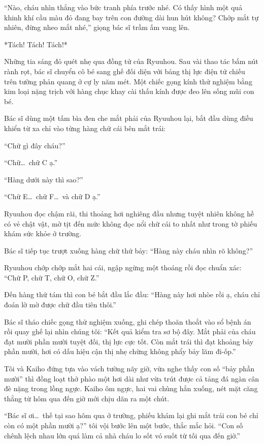 \documentclass[../main.tex]{subfiles}
\begin{document}
``Nào, cháu nhìn thẳng vào bức tranh phía trước nhé. Có thấy hình một quả khinh khí cầu màu đỏ đang bay trên con đường dài hun hút không? Chớp mắt tự nhiên, đừng nheo mắt nhé,'' giọng bác sĩ trầm ấm vang lên.

*Tách! Tách! Tách!*

Những tia sáng đỏ quét nhẹ qua đồng tử của Ryuuhou. Sau vài thao tác bấm nút rành rọt, bác sĩ chuyển cô bé sang ghế đối diện với bảng thị lực điện tử chiếu trên tường phản quang ở cự ly năm mét. Một chiếc gọng kính thử nghiệm bằng kim loại nặng trịch với hàng chục khay cài thấu kính được đeo lên sống mũi con bé.

Bác sĩ dùng một tấm bìa đen che mắt phải của Ryuuhou lại, bắt đầu dùng điều khiển từ xa chỉ vào từng hàng chữ cái bên mắt trái:

``Chữ gì đây cháu?''

``Chữ\dots\ chữ C ạ.''

``Hàng dưới này thì sao?''

``Chữ E\dots\ chữ F\dots\ và chữ D ạ.''

Ryuuhou đọc chậm rãi, thi thoảng hơi nghiêng đầu nhưng tuyệt nhiên không hề có vẻ chật vật, mờ tịt đến mức không đọc nổi chữ cái to nhất như trong tờ phiếu khám sức khỏe ở trường.

Bác sĩ tiếp tục trượt xuống hàng chữ thứ bảy: ``Hàng này cháu nhìn rõ không?''

Ryuuhou chớp chớp mắt hai cái, ngập ngừng một thoáng rồi đọc chuẩn xác: ``Chữ P, chữ T, chữ O, chữ Z.''

Đến hàng thứ tám thì con bé bắt đầu lắc đầu: ``Hàng này hơi nhòe rồi ạ, cháu chỉ đoán lờ mờ được chữ đầu tiên thôi.''

Bác sĩ tháo chiếc gọng thử nghiệm xuống, ghi chép thoăn thoắt vào sổ bệnh án rồi quay ghế lại nhìn chúng tôi: ``Kết quả kiểm tra sơ bộ đây. Mắt phải của cháu đạt mười phần mười tuyệt đối, thị lực cực tốt. Còn mắt trái thì đạt khoảng bảy phần mười, hơi có dấu hiệu cận thị nhẹ chừng không phẩy bảy lăm đi-ốp.''

Tôi và Kaiho đứng tựa vào vách tường nãy giờ, vừa nghe thấy con số ``bảy phần mười'' thì đồng loạt thở phào một hơi dài như vừa trút được cả tảng đá ngàn cân đè nặng trong lồng ngực. Kaiho ôm ngực, hai vai chùng hẳn xuống, nét mặt căng thẳng từ hôm qua đến giờ mới chịu dãn ra một chút.

``Bác sĩ ơi\dots\ thế tại sao hôm qua ở trường, phiếu khám lại ghi mắt trái con bé chỉ còn có một phần mười ạ?'' tôi vội bước lên một bước, thắc mắc hỏi. ``Con số chênh lệch nhau lớn quá làm cả nhà cháu lo sốt vó suốt từ tối qua đến giờ.''
\end{document}
